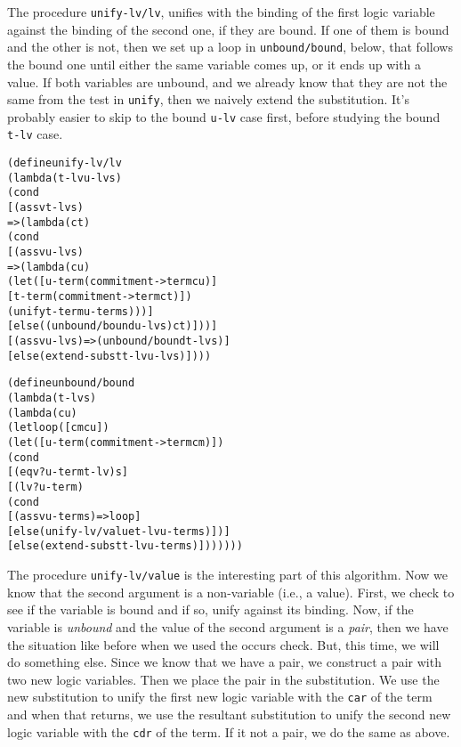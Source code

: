 The procedure \texttt{unify-lv/lv}, unifies with the binding of the
first logic variable against the binding of the second one, if they
are bound.  If one of them is bound and the other is not, then
we set up a loop in \texttt{unbound/bound}, below, that follows the
bound one until either the same variable comes up, or it ends up with
a value.  If both variables are unbound, and we already know that they
are not the same from the test in \texttt{unify}, then we naively
extend the substitution.  It's probably easier to skip to the bound
\texttt{u-lv} case first, before studying the bound \texttt{t-lv}
case.

\begin{alltt}
(define unify-lv/lv
  (lambda (t-lv u-lv s)
    (cond
      [(assv t-lv s)
       => (lambda (ct)
            (cond
              [(assv u-lv s)
               => (lambda (cu)
                    (let ([u-term (commitment->term cu)]
                          [t-term (commitment->term ct)])
                      (unify t-term u-term s)))]
              [else ((unbound/bound u-lv s) ct)]))]
      [(assv u-lv s) => (unbound/bound t-lv s)]
      [else (extend-subst t-lv u-lv s)])))

(define unbound/bound
  (lambda (t-lv s)
    (lambda (cu)
      (let loop ([cm cu])
        (let ([u-term (commitment->term cm)])
          (cond
            [(eqv? u-term t-lv) s]
            [(lv? u-term)
             (cond
               [(assv u-term s) => loop]
               [else (unify-lv/value t-lv u-term s)])]
            [else (extend-subst t-lv u-term s)]))))))
\end{alltt}
The procedure \texttt{unify-lv/value} is the interesting
part of this algorithm.  Now we know that the second argument
is a non-variable (i.e., a value).  First, we check to see
if the variable is bound and if so, unify against its binding.
Now, if the variable is \emph{unbound} and the value of the
second argument is a \emph{pair}, then we have the situation
like before when we used the occurs check.  But, this time,
we will do something else.  Since we know that we have a pair,
we construct a pair with two new logic variables.  Then we
place the pair in the substitution.  We use the new substitution
to unify the first new logic variable with the \texttt{car} of
the term and when that returns, we use the resultant substitution
to unify the second new logic variable with the \texttt{cdr} of
the term.  If it not a pair, we do the same as above.

